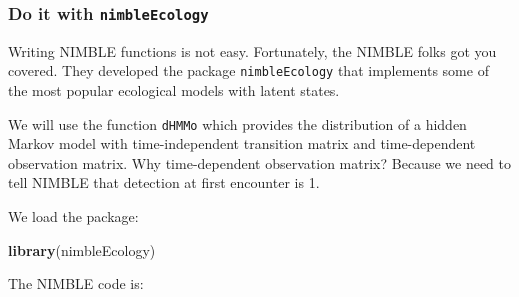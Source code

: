 \documentclass[
  12pt,
]{krantz}
\newenvironment{Shaded}{\begin{snugshade}}{\end{snugshade}}
\newcommand{\FunctionTok}[1]{\textcolor[rgb]{0.13,0.29,0.53}{\textbf{#1}}}
\newcommand{\NormalTok}[1]{#1}
\begin{document}
\subsubsection{\texorpdfstring{Do it with \texttt{nimbleEcology}}{Do it with nimbleEcology}}\label{do-it-with-nimbleecology}

Writing NIMBLE functions is not easy. Fortunately, the NIMBLE folks got you covered. They developed the package \texttt{nimbleEcology} that implements some of the most popular ecological models with latent states.

We will use the function \texttt{dHMMo} which provides the distribution of a hidden Markov model with time-independent transition matrix and time-dependent observation matrix. Why time-dependent observation matrix? Because we need to tell NIMBLE that detection at first encounter is 1.

We load the package:

\begin{Shaded}
\begin{Highlighting}[]
\FunctionTok{library}\NormalTok{(nimbleEcology)}
\end{Highlighting}
\end{Shaded}

The NIMBLE code is:
\end{document}
